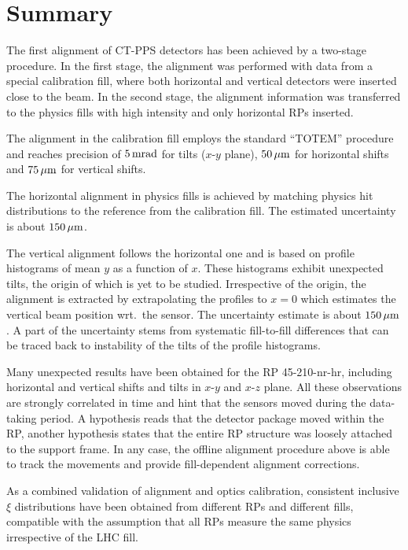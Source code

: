 \documentclass[TOTEM]{cern/cernphprep}
\def\un#1{\,{\rm #1}}
\begin{document}

\section{Summary}
\label{s:sum}

The first alignment of CT-PPS detectors has been achieved by a two-stage procedure. In the first stage, the alignment was performed with data from a special calibration fill, where both horizontal and vertical detectors were inserted close to the beam. In the second stage, the alignment information was transferred to the physics fills with high intensity and only horizontal RPs inserted.

The alignment in the calibration fill employs the standard ``TOTEM'' procedure and reaches precision of $5\un{mrad}$ for tilts ($x$-$y$ plane), $50\un{\mu m}$ for horizontal shifts and $75\un{\mu m}$ for vertical shifts.

The horizontal alignment in physics fills is achieved by matching physics hit distributions to the reference from the calibration fill. The estimated uncertainty is about $150\un{\mu m}$.

The vertical alignment follows the horizontal one and is based on profile histograms of mean $y$ as a function of $x$. These histograms exhibit unexpected tilts, the origin of which is yet to be studied. Irrespective of the origin, the alignment is extracted by extrapolating the profiles to $x=0$ which estimates the vertical beam position wrt.~the sensor. The uncertainty estimate is about $150\un{\mu m}$. A part of the uncertainty stems from systematic fill-to-fill differences that can be traced back to instability of the tilts of the profile histograms.

Many unexpected results have been obtained for the RP 45-210-nr-hr, including horizontal and vertical shifts and tilts in $x$-$y$ and $x$-$z$ plane. All these observations are strongly correlated in time and hint that the sensors moved during the data-taking period. A hypothesis reads that the detector package moved within the RP, another hypothesis states that the entire RP structure was loosely attached to the support frame. In any case, the offline alignment procedure above is able to track the movements and provide fill-dependent alignment corrections.

As a combined validation of alignment and optics calibration, consistent inclusive $\xi$ distributions have been obtained from different RPs and different fills, compatible with the assumption that all RPs measure the same physics irrespective of the LHC fill.
\end{document}

